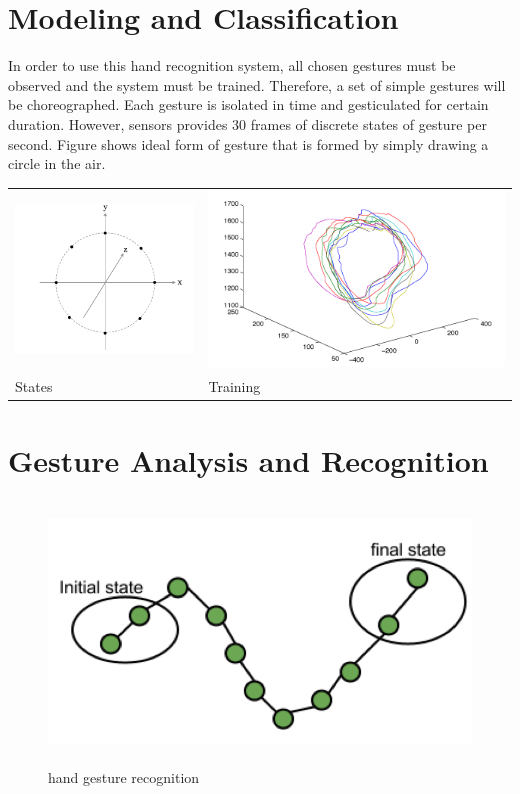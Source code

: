 \section{Modeling and Classification}
In order to use this hand recognition system, all chosen gestures must be observed and the system must be trained. Therefore, a set of simple gestures will be choreographed. Each gesture is isolated in time and gesticulated for certain duration. However, sensors provides 30 frames of discrete states of gesture per second. Figure shows ideal form of gesture that is formed by simply drawing a circle in the air.


\begin{table}
	[h] \centering 
	\begin{tabular}
		{ll} 
		\includegraphics[width=6cm]{figures/ges-states.png} & 
		\includegraphics[width=10cm]{figures/ges-train.png} \\
		States & Training 
	\end{tabular}
\end{table}

\section{Gesture Analysis and Recognition}
\begin{figure}
	[h] \centering 
	\includegraphics[height=7cm]{figures/ges-rec.png} \caption{ hand gesture recognition} \label{fig:ges:reg} 
\end{figure}
